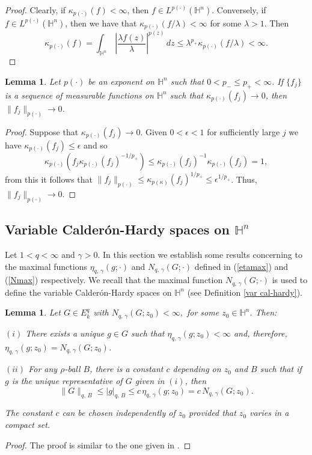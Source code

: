 \documentclass[oneside,10pt]{article}
\newtheorem{lemma}[theorem]{Lemma}
\begin{document}
\begin{proof} Clearly, if $\kappa_{p(\cdot)}(f) < \infty$, then $f\in L^{p(\cdot)}(\mathbb{H}^{n})$. Conversely, if 
$f\in L^{p(\cdot)}(\mathbb{H}^{n})$, then we have that $\kappa_{p(\cdot)}(f / \lambda) < \infty$ for some $\lambda >1$. Then
\[
\kappa_{p(\cdot)}(f)= \int_{\mathbb{H}^{n}} \, \left| \frac{\lambda f(z)}{\lambda} \right|^{p(z)} \, dz \leq 
\lambda^{p_{+}} \kappa_{p(\cdot)}(f / \lambda) < \infty.
\]
\end{proof}

\begin{lemma} \label{modular a cero} Let $p(\cdot)$ be an exponent on $\mathbb{H}^n$ such that $0 < p_{-} \leq p_{+} < \infty$. If $\{ f_j \}$ is a sequence of measurable functions on $\mathbb{H}^n$ such that $\kappa_{p(\cdot)}(f_j) \rightarrow 0$, then $\| f_j \|_{p(\cdot)} \rightarrow 0$.
\end{lemma}

\begin{proof} Suppose that $\kappa_{p(\cdot)}(f_j) \rightarrow 0$. Given $0 < \epsilon < 1$ for sufficiently large $j$ we have 
$\kappa_{p(\cdot)}(f_j) \leq \epsilon$ and so
\[
\kappa_{p(\cdot)}\left(f_j \kappa_{p(\cdot)}(f_j)^{-1/p_{+}}\right) \leq \kappa_{p(\cdot)}(f_j)^{-1} \kappa_{p(\cdot)}(f_j) =1,
\]
from this it follows that $\| f_j \|_{p(\cdot)} \leq \kappa_{p(\kappa)}(f_j)^{1/p_{+}} \leq \epsilon^{1/p_{+}}$. Thus, 
$\| f_j \|_{p(\cdot)} \rightarrow 0$.
\end{proof}

\subsection{Variable Calder\'on-Hardy spaces on $\mathbb{H}^{n}$}

Let $1 < q < \infty$ and $\gamma > 0$. In this section we establish some results concerning to the maximal functions 
$\eta_{q, \, \gamma} (g; \cdot)$ and $N_{q, \, \gamma}(G; \cdot)$ defined in (\ref{etamax}) and (\ref{Nmax}) respectively. We recall that 
the maximal function $N_{q, \, \gamma}(G; \cdot)$ is used to define the variable Calder\'on-Hardy spaces on $\mathbb{H}^{n}$ 
(see Definition \ref{var cal-hardy}).

\begin{lemma} \label{puntual 1} Let $G \in E^{q}_{k}$ with $N_{q, \, \gamma}(G; z_0) < \infty,$ for some $z_0 \in \mathbb{H}^{n}$. Then:

$(i)$ There exists a unique $g \in G$ such that $\eta_{q, \, \gamma} (g; z_0) < \infty$ and, therefore, 
$\eta_{q, \, \gamma} (g; z_0) = N_{q, \, \gamma}(G; z_0)$.

$(ii)$ For any $\rho$-ball $B$, there is a constant $c$ depending on $z_0$ and $B$ such that if $g$ is the unique representative of $G$ given in $(i)$, then
$$\|G\|_{q, \, B} \leq |g|_{q, \, B} \leq c \, \eta_{q, \, \gamma} (g; z_0) = c \, N_{q, \, \gamma}(G; z_0).$$

The constant $c$ can be chosen independently of $z_0$ provided that $z_0$ varies in a compact set.
\end{lemma}
\begin{proof} The proof is similar to the one given in \cite[Lemma 3]{segovia}.
\end{proof}
\end{document}
